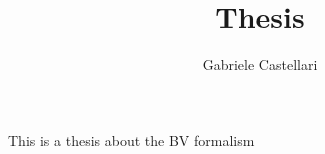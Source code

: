 \documentclass[12pt]{article}
\begin{document}
\title{Thesis}
\author{Gabriele Castellari}
\maketitle
This is a thesis about the BV formalism
\end{document}
